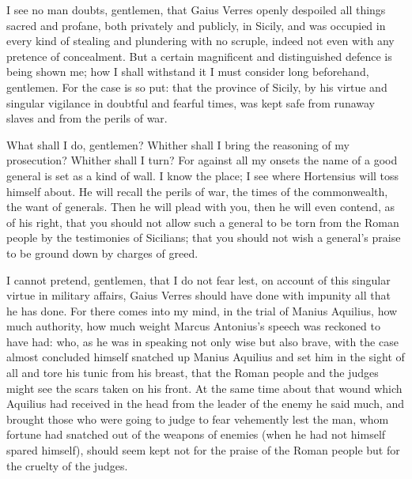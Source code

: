 %

 I see no man doubts, gentlemen, that Gaius Verres openly despoiled all things sacred and profane, both privately and publicly, in Sicily, and was occupied in every kind of stealing and plundering with no scruple, indeed not even with any pretence of concealment. But a certain magnificent and distinguished defence is being shown me; how I shall withstand it I must consider long beforehand, gentlemen. For the case is so put: that the province of Sicily, by his virtue and singular vigilance in doubtful and fearful times, was kept safe from runaway slaves and from the perils of war.

 What shall I do, gentlemen? Whither shall I bring the reasoning of my prosecution? Whither shall I turn? For against all my onsets the name of a good general is set as a kind of wall. I know the place; I see where Hortensius will toss himself about. He will recall the perils of war, the times of the commonwealth, the want of generals. Then he will plead with you, then he will even contend, as of his right, that you should not allow such a general to be torn from the Roman people by the testimonies of Sicilians; that you should not wish a general's praise to be ground down by charges of greed.

 I cannot pretend, gentlemen, that I do not fear lest, on account of this singular virtue in military affairs, Gaius Verres should have done with impunity all that he has done. For there comes into my mind, in the trial of Manius Aquilius, how much authority, how much weight Marcus Antonius's speech was reckoned to have had: who, as he was in speaking not only wise but also brave, with the case almost concluded himself snatched up Manius Aquilius and set him in the sight of all and tore his tunic from his breast, that the Roman people and the judges might see the scars taken on his front. At the same time about that wound which Aquilius had received in the head from the leader of the enemy he said much, and brought those who were going to judge to fear vehemently lest the man, whom fortune had snatched out of the weapons of enemies (when he had not himself spared himself), should seem kept not for the praise of the Roman people but for the cruelty of the judges.

